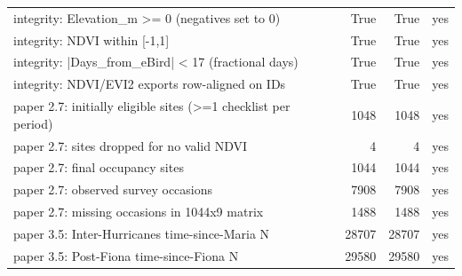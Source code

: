 \begin{longtable}{p{7.4cm}rrc}
integrity: Elevation\_m >= 0 (negatives set to 0) & True & True & yes \\
integrity: NDVI within [-1,1] & True & True & yes \\
integrity: |Days\_from\_eBird| < 17 (fractional days) & True & True & yes \\
integrity: NDVI/EVI2 exports row-aligned on IDs & True & True & yes \\
paper 2.7: initially eligible sites (>=1 checklist per period) & 1048 & 1048 & yes \\
paper 2.7: sites dropped for no valid NDVI & 4 & 4 & yes \\
paper 2.7: final occupancy sites & 1044 & 1044 & yes \\
paper 2.7: observed survey occasions & 7908 & 7908 & yes \\
paper 2.7: missing occasions in 1044x9 matrix & 1488 & 1488 & yes \\
paper 3.5: Inter-Hurricanes time-since-Maria N & 28707 & 28707 & yes \\
paper 3.5: Post-Fiona time-since-Fiona N & 29580 & 29580 & yes \\
\bottomrule
\end{longtable}